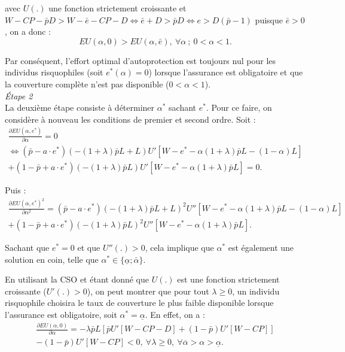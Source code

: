 \begin{Article}
\begin{refsection}[Mouminoux]
\begin{appendices}
\noindent avec $U(.)$ une fonction strictement croissante et $W-CP-\bar pD>W - \bar e -CP - D \Leftrightarrow \bar e+D>\bar pD \Leftrightarrow e>D(\bar p-1) $ puisque $\bar e>0$, on a donc :
\begin{equation}
EU(\alpha, 0)>EU(\alpha, \bar e),~\forall\alpha~;~ 0<\alpha<1.
\end{equation}

Par conséquent, l'effort optimal d'autoprotection est toujours nul pour les individus risquophiles (soit $e^*(\alpha)=0$) lorsque l'assurance est obligatoire et que la couverture complète n'est pas disponible ($0<\alpha<1$). \\

\textit{Étape 2} \\

La deuxième étape consiste à déterminer $\alpha^*$ sachant $e^*$. Pour ce faire, on considère à nouveau les conditions de premier et second ordre. Soit :
\begin{multline}
\frac{\partial EU(\alpha, e^*)}{\partial \alpha}=0 \\
\Leftrightarrow  (\bar{p}-a\cdot e^*)(-(1+\lambda)\bar{p}L+L)U'[W - e^* -\alpha(1+\lambda)\bar{p}L - (1 - \alpha)L] \\
 + (1 - \bar{p}+a\cdot e^*)(-(1 + \lambda)\bar{p}L)U'[W - e^* - \alpha(1 + \lambda)\bar{p}L]=0.
\end{multline}

Puis :
\begin{multline}
\frac{\partial EU(\alpha, e^*)^2}{\partial \alpha^2}=(\bar{p}-a\cdot e^*)(-(1+\lambda)\bar{p}L+L)^2U''[W - e^* -\alpha(1+\lambda)\bar{p}L - (1 - \alpha)L] \\
+(1 - \bar{p}+a\cdot e^*)(-(1 + \lambda)\bar{p}L)^2U''[W - e^* - \alpha(1 + \lambda)\bar{p}L].
\end{multline}

Sachant que $e^*=0$ et que $U''(.)>0$, cela implique que $\alpha^*$ est également une solution en coin, telle que $\alpha^* \in \{\underline{\alpha};\bar{\alpha}\}$.

En utilisant la CSO et étant donné que $U(.)$ est une fonction strictement croissante ($U'(.)>0$), on peut montrer que pour tout $\lambda \geq 0$, un individu risquophile choisira le taux de couverture le plus faible disponible lorsque l'assurance est obligatoire, soit $\alpha^*=\underline{\alpha}$. En effet, on a :
\begin{multline}
\frac{\partial EU(\alpha, 0)}{\partial \alpha}=-\lambda\bar{p}L[\bar{p}U'[W -CP-D]+(1 - \bar{p})U'[W -CP]] \\
-(1 - \bar{p})U'[W -CP]<0, ~\forall \lambda \geq 0 ,~\forall \overline \alpha >\alpha >\underline \alpha.
\end{multline}


\end{appendices}
\end{refsection}
\end{Article}

